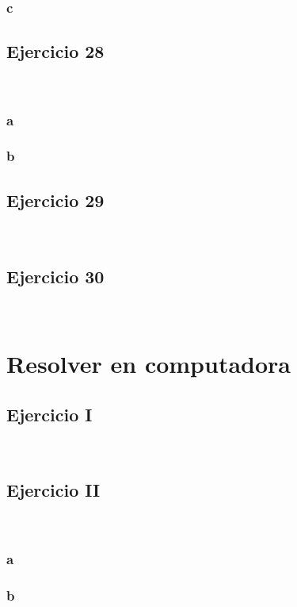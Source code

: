 \documentclass{article}
\begin{document}
\subsubsection*{c}

\subsection*{Ejercicio 28}

\

\subsubsection*{a}

\subsubsection*{b}

\subsection*{Ejercicio 29}

\

\subsection*{Ejercicio 30}

\

\section*{Resolver en computadora}

\subsection*{Ejercicio I}

\

\subsection*{Ejercicio II}

\

\subsubsection*{a}

\subsubsection*{b}
\end{document}
